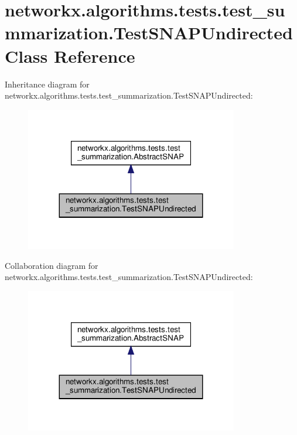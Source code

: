 \hypertarget{classnetworkx_1_1algorithms_1_1tests_1_1test__summarization_1_1TestSNAPUndirected}{}\section{networkx.\+algorithms.\+tests.\+test\+\_\+summarization.\+Test\+S\+N\+A\+P\+Undirected Class Reference}
\label{classnetworkx_1_1algorithms_1_1tests_1_1test__summarization_1_1TestSNAPUndirected}


Inheritance diagram for networkx.\+algorithms.\+tests.\+test\+\_\+summarization.\+Test\+S\+N\+A\+P\+Undirected\+:
\nopagebreak
\begin{figure}[H]
\begin{center}
\leavevmode
\includegraphics[width=263pt]{classnetworkx_1_1algorithms_1_1tests_1_1test__summarization_1_1TestSNAPUndirected__inherit__graph}
\end{center}
\end{figure}


Collaboration diagram for networkx.\+algorithms.\+tests.\+test\+\_\+summarization.\+Test\+S\+N\+A\+P\+Undirected\+:
\nopagebreak
\begin{figure}[H]
\begin{center}
\leavevmode
\includegraphics[width=263pt]{classnetworkx_1_1algorithms_1_1tests_1_1test__summarization_1_1TestSNAPUndirected__coll__graph}
\end{center}
\end{figure}
